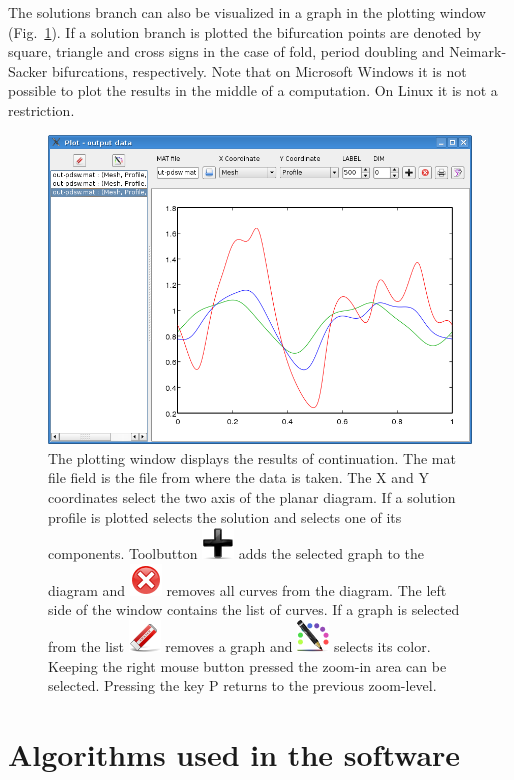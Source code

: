 \documentclass[10pt,a4paper]{ddedoc}
\newcommand{\iconAdd}{\protect\includegraphics[height=0.8\baselineskip]{fig/cr32-action-add}}
\newcommand{\iconEraser}{\protect\includegraphics[height=0.8\baselineskip]{fig/cr32-action-eraser}}
\newcommand{\iconColorize}{\protect\includegraphics[height=0.8\baselineskip]{fig/cr32-action-colorize}}
\newcommand{\iconRemove}{\protect\includegraphics[height=0.8\baselineskip]{fig/cr32-action-remove}}
\begin{document}
The solutions branch can also be visualized in a graph in the plotting window (Fig.\
\ref{plotwindow}). If a solution branch is plotted the bifurcation points are
denoted by square, triangle and cross signs in the case of fold, period doubling
and Neimark-Sacker bifurcations, respectively. Note that on Microsoft Windows it is not
possible to plot the results in the middle of a computation. On Linux it is not
a restriction.
\begin{figure}
\begin{center}
\includegraphics[scale=0.5]{fig/plotwindow}
\caption{The plotting window displays the results of continuation. The {\sc{}mat} file field is the file from where the data is taken.
The X and Y coordinates select the two axis of the planar diagram. If a solution profile is plotted \filef{LABEL} selects the solution 
and \filef{DIM} selects one of its components. Toolbutton \iconAdd{} adds the selected graph to the diagram and 
\iconRemove{} removes all curves from the diagram.
The left side of the window contains the list of curves. If a graph is selected from the list \iconEraser{} removes a graph and \iconColorize{} selects its color.
Keeping the right mouse button pressed the zoom-in area can be selected. Pressing the key P returns to the previous zoom-level.}
\label{plotwindow}
\end{center}
\end{figure}

\section{Algorithms used in the software}
\end{document}
